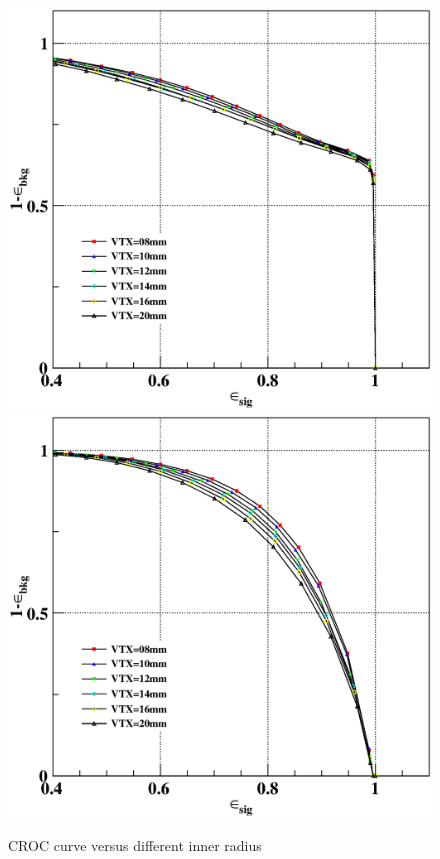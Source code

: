 \documentclass[usetikz]{style/cepcnote}
\begin{document}
\begin{figure}[!ht]
	\centering
	\includegraphics[scale=0.35]{figures/radius/plot6ROC-bbkg-cjet.eps}
	\includegraphics[scale=0.35]{figures/radius/plot6ROC-obkg-cjet.eps}
	\caption{CROC curve versus different inner radius}
	\label{fig:ROC_radius_c}
\end{figure}
\end{document}
